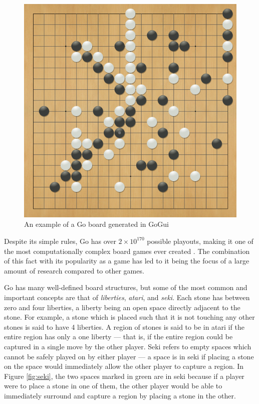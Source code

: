 \begin{figure}[h]
\centering
\includegraphics[scale=0.25]{images/gogui.png}
\caption{An example of a Go board generated in GoGui \cite{fuego}}
\label{ref:gogui}
\end{figure}

Despite its simple rules, Go has over $2 \times 10^{170}$ possible playouts, making it one of the most computationally complex board games ever created \cite{Trompfinal}.  The combination of this fact with its popularity as a game has led to it being the focus of a large amount of research compared to other games.

Go has many well-defined board structures, but some of the most common and important concepts are that of \textit{liberties}, \textit{atari}, and \textit{seki}.  Each stone has between zero and four liberties, a liberty being an open space directly adjacent to the stone.  For example, a stone which is placed such that it is not touching any other stones is said to have 4 liberties.  A region of stones is said to be in atari if the entire region has only a one liberty --- that is, if the entire region could be captured in a single move by the other player.  Seki refers to empty spaces which cannot be safely played on by either player --- a space is in seki if placing a stone on the space would immediately allow the other player to capture a region.  In Figure \ref{fig:seki}, the two spaces marked in green are in seki because if a player were to place a stone in one of them, the other player would be able to immediately surround and capture a region by placing a stone in the other.

